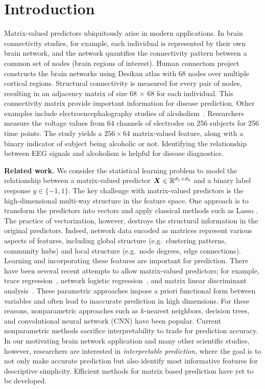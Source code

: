 \documentclass[11pt]{article}
\theoremstyle{definition}
\begin{document}
\section{Introduction }

Matrix-valued predictors ubiquitously arise in modern applications. In brain connectivity studies, for example, each individual is represented by their own brain network, and the network quantifies the connectivity pattern between a common set of nodes (brain regions of interest). Human connectom project~\citep{wang2017bayesian} constructs the brain networks using Desikan atlas with 68 nodes over multiple cortical regions. Structural connectivity is measured for every pair of nodes, resulting in an adjacency matrix of size 68 $\times$ 68 for each individual. This connectivity matrix provide important information for disease prediction. Other examples include electroencephalography studies of alcoholism~\citep{zhou2014regularized}. Researchers measure the voltage values from 64 channels of electrodes on 256 subjects for 256 time points. The study yields a $256 \times 64$ matrix-valued feature, along with a binary indicator of subject being alcoholic or not. Identifying the relationship between EEG signals and alcoholism is helpful for disease diagnostics. 


{\bf Related work.} We consider the statistical learning problem to model the relationship between a matrix-valued predictor $\bm X \in \mathbb{R}^{d_1\times d_2}$ and a binary label response $y\in\{-1,1\}$.  The key challenge with matrix-valued predictors is the high-dimensional multi-way structure in the feature space. One approach is to transform the predictors into vectors and apply classical methods such as Lasso \citep{friedman2010regularization}. The practice of vectorization, however, destroys the structural information in the original predictors. Indeed, network data encoded as matrices represent various aspects of features, including global structure (e.g.\ clustering patterns, community hubs) and local structure (e.g.\ node degrees, edge connections). Learning and incorporating these features are important for prediction. There have been several recent attempts to allow matrix-valued predictors; for example, trace regression~\citep{fan2019generalized}, network logistic regression~\citep{relion2019network}, and matrix linear discriminant analysis~\citep{hu2020matrix}. These parametric approaches impose a priori functional form between variables and often lead to inaccurate prediction in high dimensions. For these reasons, nonparametric approaches such as $k$-nearest neighbors, decision trees, and convolutional neural network (CNN) have been popular. Current nonparametric methods sacrifice interpretability to trade for prediction accuracy. In our motivating brain network application and many other scientific studies, however, researchers are interested in {\it interpretable prediction}, where the goal is to not only make accurate prediction but also identify most informative features for descriptive simplicity. Efficient methods for matrix based prediction have yet to be developed. 
 
\end{document}
